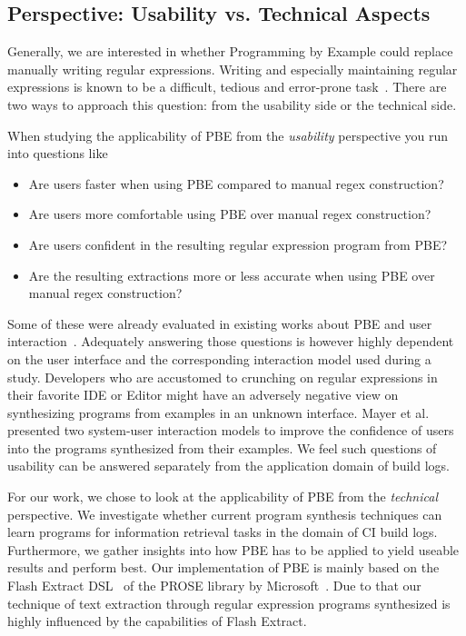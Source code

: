 \documentclass[\myrootdir/main.tex]{subfiles}
\begin{document}
\subsection{Perspective: Usability vs. Technical Aspects}
Generally, we are interested in whether Programming by Example could replace manually writing regular expressions.
Writing and especially maintaining regular expressions is known to be a difficult, tedious and error-prone task~\cite{michael2019regexes}.
There are two ways to approach this question: from the usability side or the technical side.

When studying the applicability of PBE from the \emph{usability} perspective you run into questions like
\begin{itemize}
	\item Are users faster when using PBE compared to manual regex construction?
	\item Are users more comfortable using PBE over manual regex construction?
	\item Are users confident in the resulting regular expression program from PBE?
	\item Are the resulting extractions more or less accurate when using PBE over manual regex construction?
\end{itemize}
Some of these were already evaluated in existing works about PBE and user interaction~\cite{mayer2015user,lau2009why-programming-by-demonstration,miller2001outlier}.
Adequately answering those questions is however highly dependent on the user interface and the corresponding interaction model used during a study.
Developers who are accustomed to crunching on regular expressions in their favorite IDE or Editor might have an adversely negative view on synthesizing programs from examples in an unknown interface.
Mayer et al.~\cite{mayer2015user} presented two system-user interaction models to improve the confidence of users into the programs synthesized from their examples.
We feel such questions of usability can be answered separately from the application domain of build logs.

For our work, we chose to look at the applicability of PBE from the \emph{technical} perspective.
We investigate whether current program synthesis techniques can learn programs for information retrieval tasks in the domain of CI build logs.
Furthermore, we gather insights into how PBE has to be applied to yield useable results and perform best.
Our implementation of PBE is mainly based on the Flash Extract DSL~\cite{le2014flashextract:} of the PROSE library by Microsoft~\cite{prose2019webpage}.
Due to that our technique of text extraction through regular expression programs synthesized is highly influenced by the capabilities of Flash Extract.
\end{document}
